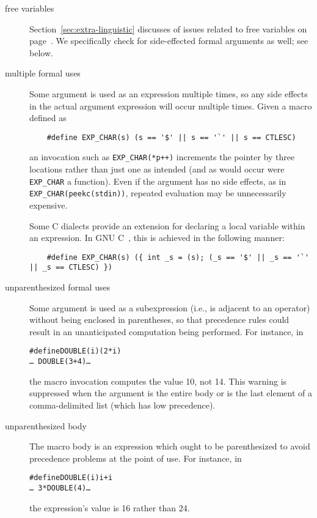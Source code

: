 \documentclass[10pt]{article}
\begin{document}
\begin{description}
\item[free variables]
  Section~\ref{sec:extra-linguistic} discusses of issues related to free
  variables on page~\pageref{page:freevar}.  We specifically check for
  side-effected formal arguments as well; see below.

\item[multiple formal uses]
  Some argument is used as an expression multiple times, so any side
  effects in the actual argument expression will occur multiple times.
  Given a macro defined as
\begin{verbatim}
    #define EXP_CHAR(s) (s == '$' || s == '`' || s == CTLESC)
\end{verbatim}
  an invocation such as {\tt \verb|EXP_CHAR|(*p++)} increments the pointer
  by three locations rather than just one as intended (and as would occur
  were \verb|EXP_CHAR| a function).  Even if the argument has no side
  effects, as in {\tt \verb|EXP_CHAR|(peekc(stdin))}, repeated evaluation may be
  unnecessarily expensive.
        
  Some C dialects provide an extension for declaring a local variable
  within an expression.  In GNU C~\cite{GCC}, this is achieved in the
  following manner:
\begin{verbatim}
    #define EXP_CHAR(s) ({ int _s = (s); (_s == '$' || _s == '`' || _s == CTLESC) })
\end{verbatim}

\item[unparenthesized formal uses]
        Some argument is used as a subexpression (i.e., is adjacent to an
        operator) without being enclosed in parentheses, so that precedence
        rules could result in an unanticipated computation being performed.
        For instance, in
\begin{alltt}
    #define DOUBLE(i) (2*i)
    \ldots\ DOUBLE(3+4) \ldots
\end{alltt}
        the macro invocation computes the value 10, not 14.
        This warning is suppressed when the argument is the entire body
        or is the last element of a comma-delimited list (which has 
        low precedence).

\item[unparenthesized body]
        The macro body is an expression which ought to be parenthesized to
        avoid precedence problems at the point of use.  For instance, in
\begin{alltt}
    #define DOUBLE(i) i+i
    \ldots\ 3*DOUBLE(4) \ldots
\end{alltt}
        the expression's value is 16 rather than 24.
        

\end{description}
\end{document}

